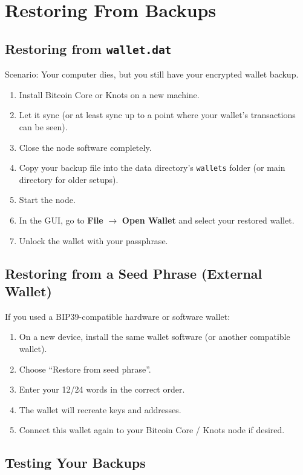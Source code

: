 \documentclass[12pt,a4paper]{book}
\begin{document}
\chapter{Restoring From Backups}

\section{Restoring from \texttt{wallet.dat}}

Scenario: Your computer dies, but you still have your encrypted wallet backup.

\begin{enumerate}
  \item Install Bitcoin Core or Knots on a new machine.
  \item Let it sync (or at least sync up to a point where your wallet's transactions can be seen).
  \item Close the node software completely.
  \item Copy your backup file into the data directory's \texttt{wallets} folder (or main directory for older setups).
  \item Start the node.
  \item In the GUI, go to \textbf{File} $\rightarrow$ \textbf{Open Wallet} and select your restored wallet.
  \item Unlock the wallet with your passphrase.
\end{enumerate}

\section{Restoring from a Seed Phrase (External Wallet)}

If you used a BIP39-compatible hardware or software wallet:

\begin{enumerate}
  \item On a new device, install the same wallet software (or another compatible wallet).
  \item Choose \enquote{Restore from seed phrase}.
  \item Enter your 12/24 words in the correct order.
  \item The wallet will recreate keys and addresses.
  \item Connect this wallet again to your Bitcoin Core / Knots node if desired.
\end{enumerate}

\section{Testing Your Backups}
\end{document}
